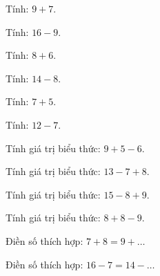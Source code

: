 \begin{ex}
Tính: $9 + 7$.
\end{ex}

\begin{ex}
Tính: $16 - 9$.
\end{ex}

\begin{ex}
Tính: $8 + 6$.
\end{ex}

\begin{ex}
Tính: $14 - 8$.
\end{ex}

\begin{ex}
Tính: $7 + 5$.
\end{ex}

\begin{ex}
Tính: $12 - 7$.
\end{ex}

\begin{ex}
Tính giá trị biểu thức: $9 + 5 - 6$.
\end{ex}

\begin{ex}
Tính giá trị biểu thức: $13 - 7 + 8$.
\end{ex}

\begin{ex}
Tính giá trị biểu thức: $15 - 8 + 9$.
\end{ex}

\begin{ex}
Tính giá trị biểu thức: $8 + 8 - 9$.
\end{ex}

\begin{ex}
Điền số thích hợp: $7 + 8 = 9 + \dots$
\end{ex}

\begin{ex}
Điền số thích hợp: $16 - 7 = 14 - \dots$
\end{ex}

